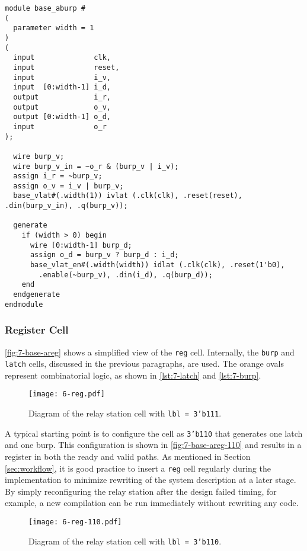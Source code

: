 \begin{lstlisting}[style={verilog-style}, caption=Burp cell from the ready-valid cell library., label=lst:7-burp]
module base_aburp #
(
  parameter width = 1
)
(
  input 	         clk,
  input 	         reset,
  input 	         i_v,
  input  [0:width-1] i_d,
  output 	         i_r,
  output 	         o_v,
  output [0:width-1] o_d,
  input 	         o_r
);

  wire burp_v;
  wire burp_v_in = ~o_r & (burp_v | i_v);
  assign i_r = ~burp_v;
  assign o_v = i_v | burp_v;
  base_vlat#(.width(1)) ivlat (.clk(clk), .reset(reset), .din(burp_v_in), .q(burp_v));
  
  generate
    if (width > 0) begin
      wire [0:width-1] burp_d;
      assign o_d = burp_v ? burp_d : i_d;
      base_vlat_en#(.width(width)) idlat (.clk(clk), .reset(1'b0), 
        .enable(~burp_v), .din(i_d), .q(burp_d));
    end
  endgenerate
endmodule
\end{lstlisting}





\subsubsection{Register Cell}
\autoref{fig:7-base-areg} shows a simplified view of the \texttt{reg} cell. Internally, the \texttt{burp} and \texttt{latch} cells, discussed in the previous paragraphs, are used. The orange ovals represent combinatorial logic, as shown in \autoref{lst:7-latch} and \autoref{lst:7-burp}.

\begin{figure}[H]
  \centering
  \texttt{[image: 6-reg.pdf]}
  \caption[Diagram of the relay station cell with lbl - 3'b111.]{Diagram of the relay station cell with \texttt{lbl = 3'b111}.}
  \label{fig:7-base-areg}
\end{figure}

A typical starting point is to configure the cell as \texttt{3'b110} that generates one latch and one burp. This configuration is shown in \autoref{fig:7-base-areg-110} and results in a register in both the ready and valid paths. As mentioned in Section \ref{sec:workflow}, it is good practice to insert a \texttt{reg} cell regularly during the implementation to minimize rewriting of the system description at a later stage. By simply reconfiguring the relay station after the design failed timing, for example, a new compilation can be run immediately without rewriting any code.

\begin{figure}[H]
  \centering
  \texttt{[image: 6-reg-110.pdf]}
  \caption[Diagram of the relay station cell with lbl = 3'b110.]{Diagram of the relay station cell with \texttt{lbl = 3'b110}.}
  \label{fig:7-base-areg-110}
\end{figure}
